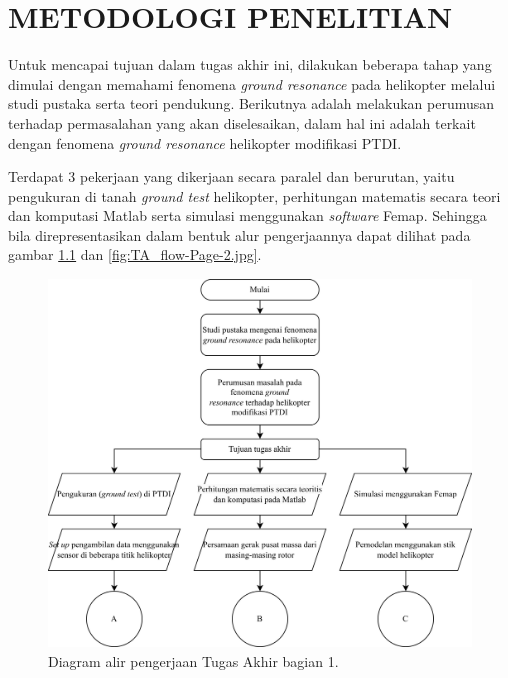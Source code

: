 \chapter{METODOLOGI PENELITIAN}
\label{chap:metodologipenelitian}


Untuk mencapai tujuan dalam tugas akhir ini, dilakukan beberapa tahap yang dimulai dengan memahami fenomena \textit{ground resonance} pada helikopter melalui studi pustaka serta teori pendukung. Berikutnya adalah melakukan perumusan terhadap permasalahan yang akan diselesaikan, dalam hal ini adalah terkait dengan fenomena \textit{ground resonance} helikopter modifikasi PTDI.

Terdapat 3 pekerjaan yang dikerjaan secara paralel dan berurutan, yaitu pengukuran di tanah \textit{ground test} helikopter, perhitungan matematis secara teori dan komputasi Matlab serta simulasi menggunakan \textit{software} Femap. Sehingga bila direpresentasikan dalam bentuk alur pengerjaannya dapat dilihat pada gambar \ref{fig:TA_flow-Page-1.jpg} dan \ref{fig:TA_flow-Page-2.jpg}.
 
\begin{figure}[H]
	\centering
	\includegraphics[width=1\linewidth]{gambar/TA_flow-Page-1.jpg}
	\caption{Diagram alir pengerjaan Tugas Akhir bagian 1.}
	\label{fig:TA_flow-Page-1.jpg}
\end{figure}

